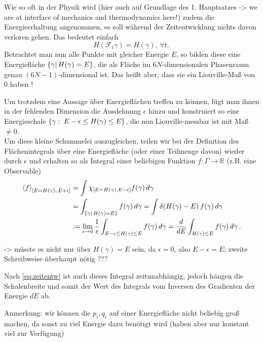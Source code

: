 \documentclass[../class_mech_main.tex]{subfiles}
\begin{document}
Wie so oft in der Physik wird (hier auch auf Grundlage des 1. Hauptsatzes -> we are at interface of mechanics and thermodynamics here!) zudem die Energieerhaltung angenommen, es soll während der Zeitentwicklung nichts davon verloren gehen. Das bedeutet einfach
\begin{equation}
H(\mathcal{F}_t \gamma) = H(\gamma), \, \forall t \, .
\end{equation}
Betrachtet man nun alle Punkte mit gleicher Energie $E$, so bilden diese eine Energiefläche $\qty{\gamma | \, H(\gamma) = E}$, die als Fläche im $6N$-dimensionalen Phasenraum genau $(6N-1)$-dimensional ist. Das heißt aber, dass sie ein Liouville-Maß von 0 haben !

Um trotzdem eine Aussage über Energieflächen treffen zu können, fügt man ihnen in der fehlenden Dimension die Ausdehnung $\epsilon$ hinzu und konstruiert so eine Energieschale $\qty{\gamma: \; E-\epsilon \leq H(\gamma) \leq E}$, die nun Liouville-messbar ist mit Maß $\neq 0$.\\
Um diese kleine Schummelei auszugleichen, teilen wir bei der Definition des Flächenintegrals über eine Energiefläche (oder einer Teilmenge davon) wieder durch $\epsilon$ und erhalten so als Integral einer beliebigen Funktion $f: \Gamma \rightarrow \mathbb{R}$ (z.B. eine Observable) 
\begin{align}\label{eq:energy}
\expval{f}_{\qty[E = H(\gamma), \, E + \epsilon]} &= \int \chi_{\qty[E = H(\gamma), E - \epsilon]} f(\gamma) \, d\gamma
\notag\\
&= \int_{\qty{\gamma | \, H(\gamma) = E}} f(\gamma) \, d\gamma = \int \delta(H(\gamma) - E) \, f(\gamma) \, d\gamma
\notag\\
&:= \lim_{\epsilon \rightarrow 0} \frac{1}{\epsilon} \int_{E-\epsilon \leq H(\gamma) \leq E} f(\gamma) \, d\gamma = \dv{E} \int_{H(\gamma) \leq E} f(\gamma) \, d\gamma \, .
\end{align}

-> müsste es nicht nur über $H(\gamma) = E$ sein, da $\epsilon = 0$, also $E - \epsilon = E$; zweite Schreibweise überhaupt nötig ???


Nach \eqref{eq:zeitentw} ist auch dieses Integral zeitunabhängig, jedoch hängen die Schalenbreite und somit der Wert des Integrals vom Inversen des Gradienten der Energie $dE$ ab.

Anmerkung: wir können die $p_i, q_i$ auf einer Energiefläche nicht beliebig groß machen, da sonst zu viel Energie dazu benötigt wird (haben aber nur konstant viel zur Verfügung)\\
\end{document}
